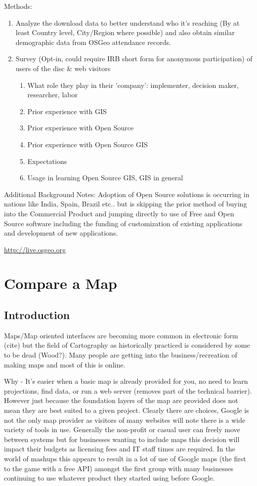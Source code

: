 \documentclass[12pt,letterpaper]{article}
\begin{document}
Methods:
\begin{enumerate}
\item Analyze the download data to better understand who it's reaching (By at least Country level, City/Region where possible) and also obtain similar demographic data from OSGeo attendance records.
\item Survey (Opt-in, could require IRB short form for anonymous participation) of users of the disc \& web visitors
	\begin{enumerate}
		\item What role they play in their 'company': implementer, decision maker, researcher, labor
		\item Prior experience with GIS
		\item Prior experience with Open Source
		\item Prior experience with Open Source GIS
		\item Expectations
		\item Usage in learning Open Source GIS, GIS in general
	\end{enumerate}
\end{enumerate}

Additional Background Notes: Adoption of Open Source solutions is occurring in nations like India, Spain, Brazil etc.. but is skipping the prior method of buying into the Commercial Product and jumping directly to use of Free and Open Source software including the funding of customization of existing applications and development of new applications.

\url{http://live.osgeo.org}

\section{Compare a Map}
\subsection{Introduction}
Maps/Map oriented interfaces are becoming more common in electronic form (cite) but the field of Cartography as historically practiced is considered by some to be dead (Wood?). Many people are getting into the business/recreation of making maps and most of this is online.

Why - It's easier when a basic map is already provided for you, no need to learn projections, find data, or run a web server (removes part of the technical barrier). However just because the foundation layers of the map are provided does not mean they are best suited to a given project. Clearly there are choices, Google is not the only map provider as visitors of many websites will note there is a wide variety of tools in use. Generally the non-profit or casual user can freely move between systems but for businesses wanting to include maps this decision will impact their budgets as licensing fees and IT staff times are required. In the world of mashups this appears to result in a lot of use of Google maps (the first to the game with a free API) amongst the first group with many businesses continuing to use whatever product they started using before Google.  
\end{document}
